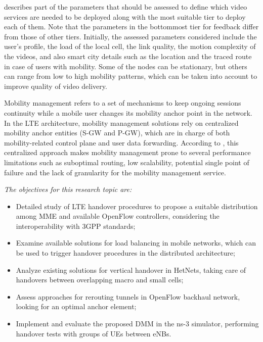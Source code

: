 describes part of the parameters that should be assessed to define which video services are needed to be deployed along with the most suitable tier to deploy each of them. Note that the parameters in the bottommost tier for feedback differ from those of other tiers.
Initially, the assessed parameters considered include the user’s profile, the load of the local cell, the link quality, the motion complexity of the videos, and also smart city details such as the location and the traced route in case of users with mobility. Some of the nodes can be stationary, but others can range from low to high mobility patterns, which can be taken into account to improve quality of video delivery.

Mobility management refers to a set of mechanisms to keep ongoing sessions
continuity while a mobile user changes its mobility anchor point in the
network. In the \ac{LTE} architecture, mobility management solutions rely on
centralized mobility anchor entities (\ac{S-GW} and \ac{P-GW}), which are in
charge of both mobility-related control plane and user data forwarding.
According to \citet{Valtulina2014}, this centralized approach makes mobility
management prone to several performance limitations such as suboptimal
routing, low scalability, potential single point of failure and the lack of
granularity for the mobility management service.

\emph{The objectives for this research topic are:}
\begin{itemize}
  \item Detailed study of \ac{LTE} handover procedures to propose a suitable
  distribution among \ac{MME} and available OpenFlow controllers, considering
  the interoperability with \ac{3GPP} standards;

  \item Examine available solutions for load balancing in mobile networks,
  which can be used to trigger handover procedures in the distributed
  architecture;

  \item Analyze existing solutions for vertical handover in \acp{HetNet},
  taking care of handovers between overlapping macro and small cells;

  \item Assess approaches for rerouting tunnels in OpenFlow backhaul network,
  looking for an optimal anchor element;

  \item Implement and evaluate the proposed \ac{DMM} in the \ac{ns-3}
  simulator, performing handover tests with groups of \acp{UE} between
  \acp{eNB}.
\end{itemize}


